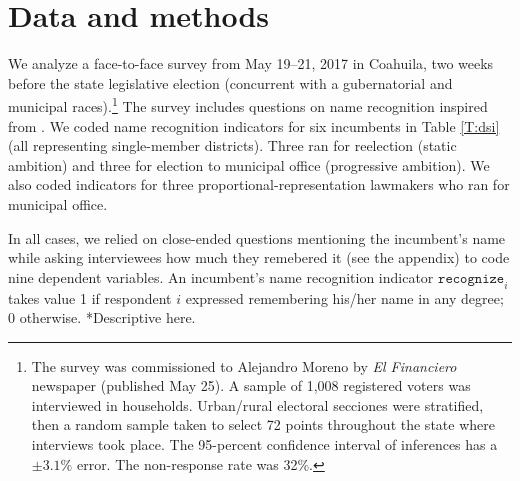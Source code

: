 \documentclass[letter,12pt]{article}
\begin{document}


\section{Data and methods}

We analyze a face-to-face survey from May 19--21, 2017 in Coahuila, two weeks before the state legislative election (concurrent with a gubernatorial and municipal races).\footnote{The survey was commissioned to Alejandro Moreno by \emph{El Financiero} newspaper (published May 25). A sample of 1,008 registered voters was interviewed in households. Urban/rural electoral secciones were stratified, then a random sample taken to select 72 points throughout the state where interviews took place. The 95-percent confidence interval of inferences has a $\pm3.1\%$ error. The non-response rate was 32\%.} The survey includes questions on name recognition inspired from \citet{cain.etal.1987}. We coded name recognition indicators for six incumbents in Table \ref{T:dsi} (all representing single-member districts). Three ran for reelection (static ambition) and three for election to municipal office (progressive ambition). We also coded indicators for three proportional-representation lawmakers who ran for municipal office. 


In all cases, we relied on close-ended questions mentioning the incumbent's name while asking interviewees how much they remebered it (see the appendix) to code nine dependent variables. An incumbent's name recognition indicator $\texttt{recognize}_i$ takes value 1 if respondent $i$ expressed remembering his/her name in any degree; 0 otherwise. *Descriptive here.
\end{document}
